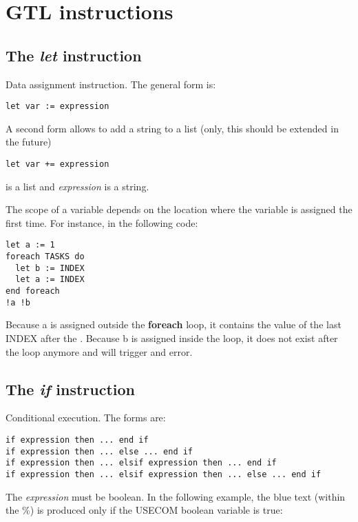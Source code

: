 \section{GTL instructions}

\subsection{The {\em let} instruction}

Data assignment instruction. The general form is:

\begin{lstlisting}[frame=single]
let var := expression
\end{lstlisting}

A second form allows to add a string to a list (only, this should be extended in the future)

\begin{lstlisting}[frame=single]
let var += expression
\end{lstlisting}

 is a list and {\em expression} is a string.

The scope of a variable depends on the location where the variable is assigned the first time. For instance, in the following code:

\begin{lstlisting}[frame=single]
let a := 1
foreach TASKS do
  let b := INDEX
  let a := INDEX
end foreach
!a !b
\end{lstlisting}

Because a is assigned outside the {\bf foreach} loop, it contains the value of the last INDEX after the . Because b is assigned inside the  loop, it does not exist after the loop anymore and  will trigger and error.


\subsection{The {\em if} instruction}

Conditional execution. The forms are:

\begin{lstlisting}[frame=single]
if expression then ... end if
if expression then ... else ... end if
if expression then ... elsif expression then ... end if
if expression then ... elsif expression then ... else ... end if
\end{lstlisting}    

The {\em expression} must be boolean. In the following example, the blue text (within the \%) is produced only if the USECOM boolean variable is true:

